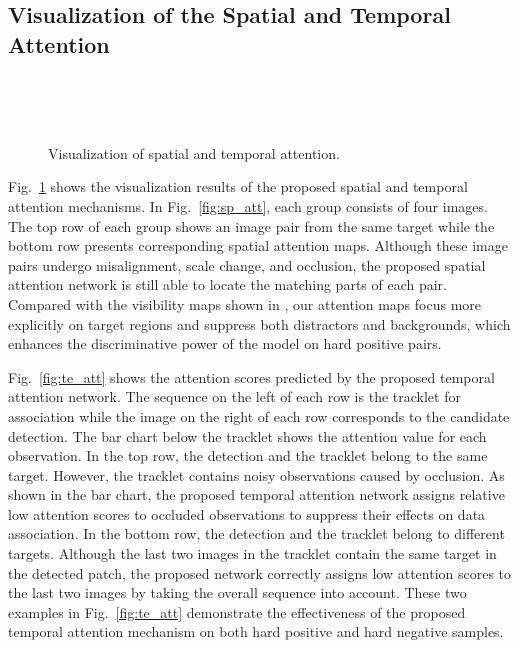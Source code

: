 \documentclass[runningheads]{llncs}
\begin{document}
  \vspace{-2mm}
  \subsection{Visualization of the Spatial and Temporal Attention}
  \begin{figure}[t]
  \begin{minipage}[t]{0.5\textwidth}
  \centering
  \\
  \end{minipage}\begin{minipage}[t]{0.5\textwidth}
  \centering
   \\
  \end{minipage}
  \caption{Visualization of spatial and temporal attention.}
  \label{fig:visual_att}
  \vspace{-4mm}
  \end{figure}
  
  Fig.~\ref{fig:visual_att} shows the visualization results of the proposed spatial and temporal attention mechanisms. In  Fig.~\ref{fig:sp_att}, each group consists of four images. The top row of each group shows an image pair from the same target while the bottom row presents corresponding spatial attention maps. Although these image pairs undergo misalignment, scale change, and occlusion, the proposed spatial attention network is still able to locate the matching parts of each pair. Compared with the visibility maps shown in \cite{STAM}, our attention maps focus more explicitly on target regions and suppress both distractors and backgrounds, which enhances the discriminative power of the model on hard positive pairs.
  
  Fig.~\ref{fig:te_att} shows the attention scores predicted by the proposed temporal attention network. The sequence on the left of each row is the tracklet for association while the image on the right of each row corresponds to the candidate detection. The bar chart below the tracklet shows the attention value for each observation. In the top row, the detection and the tracklet belong to the same target. However, the tracklet contains noisy observations caused by occlusion. As shown in the bar chart, the proposed temporal attention network assigns relative low attention scores to occluded observations to suppress their effects on data association. In the bottom row, the detection and the tracklet belong to different targets. Although the last two images in the tracklet contain the same target in the detected patch, the proposed network correctly assigns low attention scores to the last two images by taking the overall sequence into account. These two examples in Fig.~\ref{fig:te_att} demonstrate the effectiveness of the proposed temporal attention mechanism on both hard positive and hard negative samples.
  
\end{document}
